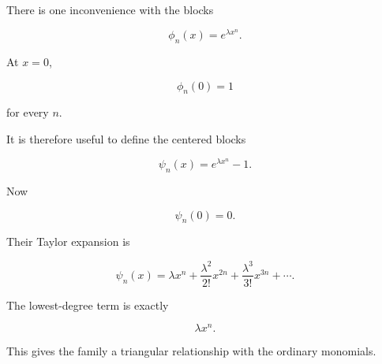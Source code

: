 There is one inconvenience with the blocks

\[
\phi_n(x)=e^{\lambda x^n}.
\]

At \(x=0\),

\[
\phi_n(0)=1
\]

for every \(n\).

It is therefore useful to define the centered blocks

\[
\boxed{
\psi_n(x)
=
e^{\lambda x^n}-1.
}
\]

Now

\[
\psi_n(0)=0.
\]

Their Taylor expansion is

\[
\psi_n(x)
=
\lambda x^n
+
\frac{\lambda^2}{2!}x^{2n}
+
\frac{\lambda^3}{3!}x^{3n}
+\cdots.
\]

The lowest-degree term is exactly

\[
\boxed{
\lambda x^n.
}
\]

This gives the family a triangular relationship with the ordinary
monomials.

